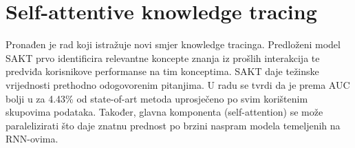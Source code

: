 
\chapter{Self-attentive knowledge tracing}
	Pronađen je rad koji istražuje novi smjer knowledge tracinga. Predloženi model SAKT prvo identificira relevantne koncepte znanja iz prošlih interakcija te predviđa korisnikove performanse na tim konceptima. SAKT daje težinske vrijednosti prethodno odogovorenim pitanjima. U radu se tvrdi da je prema AUC bolji u za 4.43\% od state-of-art metoda uprosječeno po svim korištenim skupovima podataka. Također, glavna komponenta (self-attention) se može paralelizirati što daje znatnu prednost po brzini naspram modela temeljenih na RNN-ovima.